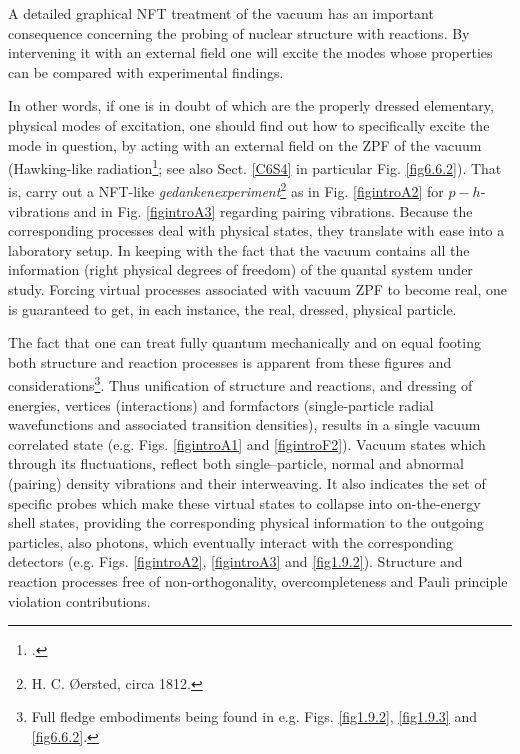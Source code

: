 A detailed graphical NFT treatment of the vacuum has an important consequence concerning the probing of nuclear structure with reactions. By intervening it with an external field one will excite the modes whose properties can be  compared with experimental findings.

In other words, if one is in doubt of which are the properly dressed elementary, physical modes of excitation, one should find out how to specifically excite the  mode in question, by acting with an external field on the ZPF of the vacuum (Hawking-like radiation\footnote{\cite{Barranco:19b}.}; see also Sect. \ref{C6S4} in particular Fig. \ref{fig6.6.2}). That is,  carry out a NFT-like \textit{gedankenexperiment}\footnote{H. C. \O{}ersted, circa 1812.} as in Fig. \ref{figintroA2} for $p-h$-vibrations and in Fig. \ref{figintroA3} regarding pairing vibrations. Because the corresponding processes deal  with physical states, they translate with ease into a laboratory setup. In keeping with the fact that the vacuum contains all the information (right physical degrees of freedom) of the quantal system under study. Forcing virtual processes associated  with vacuum ZPF to become real, one is guaranteed to get, in each instance, the real, dressed, physical particle. 

The fact that one can treat fully quantum mechanically and on equal footing both structure and reaction processes is apparent from these figures and considerations\footnote{Full fledge embodiments being found in e.g. Figs. \ref{fig1.9.2}, \ref{fig1.9.3} and  \ref{fig6.6.2}.}. Thus unification of structure and reactions, and dressing of energies, vertices (interactions) and formfactors (single-particle radial wavefunctions and associated transition densities), results in a single vacuum correlated state (e.g. Figs. \ref{figintroA1} and \ref{figintroF2}). Vacuum states which through its fluctuations, reflect both single--particle, normal and abnormal (pairing) density vibrations and their interweaving.  It also indicates the  set of specific probes which make  these virtual states to collapse into on-the-energy shell states, providing the corresponding physical information to the   outgoing particles, also photons, which eventually interact with the corresponding detectors (e.g. Figs. \ref{figintroA2}, \ref{figintroA3} and \ref{fig1.9.2}). Structure and reaction processes free of non-orthogonality, overcompleteness and Pauli principle violation contributions.


